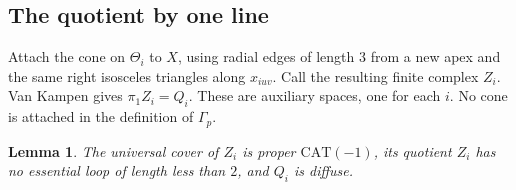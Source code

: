 \documentclass[11pt,a4paper]{article}
\newtheorem{lemma}[theorem]{Lemma}
\numberwithin{equation}{section}
\begin{document}
\subsection{The quotient by one line}

Attach the cone on $\Theta_i$ to $X$, using radial edges of length $3$ from a
new apex and the same right isosceles triangles along $x_{iuv}$. Call the
resulting finite complex $Z_i$. Van Kampen gives $\pi_1 Z_i=Q_i$. These are
auxiliary spaces, one for each $i$. No cone is attached in the definition of
$\Gamma_p$.

\begin{lemma}
The universal cover of $Z_i$ is proper $\mathrm{CAT}(-1)$, its quotient $Z_i$
has no essential loop of length less than $2$, and $Q_i$ is diffuse.
\end{lemma}
\end{document}
